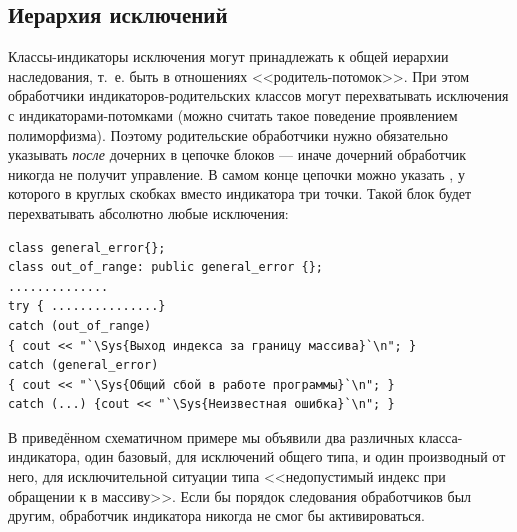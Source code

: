 \subsection[Иерархия исключений]{Иерархия исключений}
Классы-индикаторы исключения могут принадлежать к общей иерархии наследования, т.~е. быть в отношениях
<<родитель-потомок>>. При этом обработчики индикаторов-родительских классов могут перехватывать исключения с
индикаторами-потомками (можно считать такое поведение проявлением полиморфизма). Поэтому родительские обработчики нужно
обязательно указывать \emph{после} дочерних в цепочке блоков  --- иначе
дочерний обработчик никогда не получит управление. В самом конце цепочки можно указать , у
которого в круглых скобках вместо индикатора три точки. Такой блок будет перехватывать абсолютно любые исключения:
\begin{lstlisting}
class general_error{};
class out_of_range: public general_error {};
..............
try { ...............}
catch (out_of_range) 
{ cout << "`\Sys{Выход индекса за границу массива}`\n"; }
catch (general_error) 
{ cout << "`\Sys{Общий сбой в работе программы}`\n"; }
catch (...) {cout << "`\Sys{Неизвестная ошибка}`\n"; }
\end{lstlisting}

В приведённом схематичном примере мы объявили два различных класса-индикатора, один базовый, для исключений общего типа,
и один производный от него, для исключительной ситуации типа <<недопустимый индекс при обращении к в массиву>>. Если бы
порядок следования обработчиков был другим, обработчик индикатора  никогда не смог
бы активироваться.

